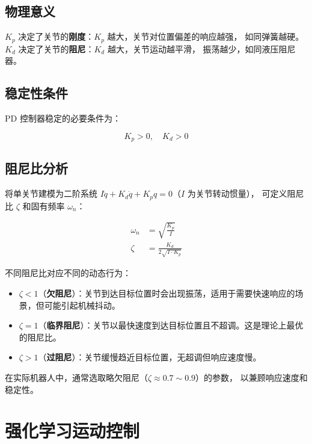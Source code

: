 \documentclass[a4paper,11pt,openany]{book}
\begin{document}
\subsection{物理意义}

$K_p$ 决定了关节的\textbf{刚度}：$K_p$ 越大，关节对位置偏差的响应越强，
如同弹簧越硬。$K_d$ 决定了关节的\textbf{阻尼}：$K_d$ 越大，关节运动越平滑，
振荡越少，如同液压阻尼器。

\subsection{稳定性条件}

PD 控制器稳定的必要条件为：

\begin{equation}
K_p > 0, \quad K_d > 0
\end{equation}

\subsection{阻尼比分析}

将单关节建模为二阶系统 $I\ddot{q} + K_d\dot{q} + K_p q = 0$（$I$ 为关节转动惯量），
可定义阻尼比 $\zeta$ 和固有频率 $\omega_n$：

\begin{align}
\omega_n &= \sqrt{\frac{K_p}{I}} \\
\zeta    &= \frac{K_d}{2\sqrt{I \cdot K_p}}
\end{align}

不同阻尼比对应不同的动态行为：

\begin{itemize}[nosep]
  \item $\zeta < 1$（\textbf{欠阻尼}）：关节到达目标位置时会出现振荡，适用于需要快速响应的场景，但可能引起机械抖动。
  \item $\zeta = 1$（\textbf{临界阻尼}）：关节以最快速度到达目标位置且不超调。这是理论上最优的阻尼比。
  \item $\zeta > 1$（\textbf{过阻尼}）：关节缓慢趋近目标位置，无超调但响应速度慢。
\end{itemize}

在实际机器人中，通常选取略欠阻尼（$\zeta \approx 0.7 \sim 0.9$）的参数，
以兼顾响应速度和稳定性。

\section{强化学习运动控制}
\label{sec:rl-locomotion}
\end{document}
